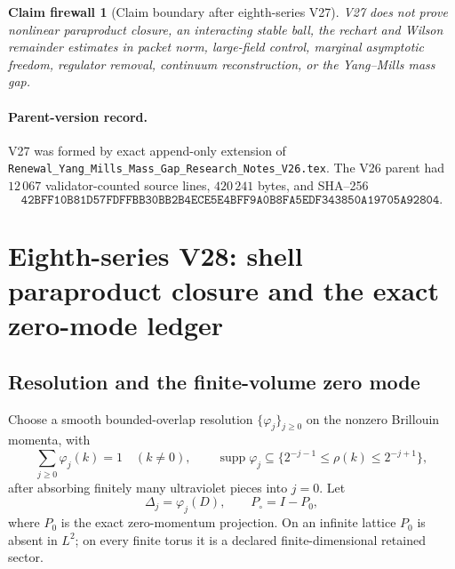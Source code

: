 \documentclass[11pt,oneside]{book}
\newtheorem{firewall}[theorem]{Claim firewall}
\theoremstyle{definition}
\theoremstyle{remark}
\begin{document}
\begin{firewall}[Claim boundary after eighth-series V27]
\label{fire:e8v27-claim}
V27 does not prove nonlinear paraproduct closure, an interacting
stable ball, the rechart and Wilson remainder estimates in packet
norm, large-field control, marginal asymptotic freedom, regulator
removal, continuum reconstruction, or the Yang--Mills mass gap.
\end{firewall}

\paragraph{Parent-version record.}
V27 was formed by exact append-only extension of
\texttt{Renewal\_Yang\_Mills\_Mass\_Gap\_Research\_Notes\_V26.tex}.
The V26 parent had \(12\,067\) validator-counted source lines,
\(420\,241\) bytes, and SHA--256
\[
\texttt{42BFF10B81D57FDFFBB30BB2B4ECE5E4BFF9A0B8FA5EDF343850A19705A92804}.
\]



\section{Eighth-series V28: shell paraproduct closure and the exact
zero-mode ledger}

\subsection{Resolution and the finite-volume zero mode}

Choose a smooth bounded-overlap resolution
\(\{\varphi_j\}_{j\geq0}\) on the nonzero Brillouin momenta, with
\[
 \sum_{j\geq0}\varphi_j(k)=1\quad(k\ne0),\qquad
 \operatorname{supp}\varphi_j
 \subseteq\{2^{-j-1}\leq\rho(k)\leq2^{-j+1}\},                   \tag{28.1}
\]
after absorbing finitely many ultraviolet pieces into \(j=0\).
Let
\[
                 \Delta_j=\varphi_j(D),\qquad
                 P_\circ=I-P_0,                                 \tag{28.2}
\]
where \(P_0\) is the exact zero-momentum projection.  On an infinite
lattice \(P_0\) is absent in \(L^2\); on every finite torus it is a
declared finite-dimensional retained sector.
\end{document}
